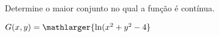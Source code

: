 
Determine o maior conjunto no qual a função é contínua.


\item $ G(x,y)=\mathlarger{\ln (x^2+ y^2-4}$
